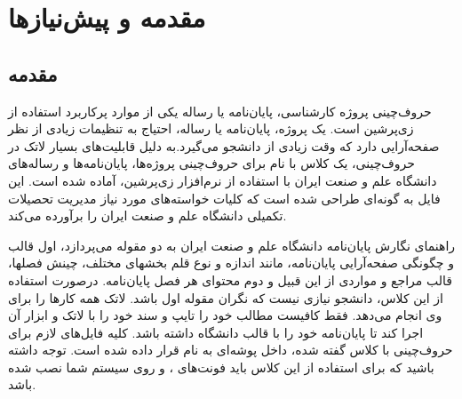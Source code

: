 
\chapter{مقدمه و پیش‌نیاز‌ها}
\thispagestyle{empty}
\section{مقدمه}
حروف‌چینی پروژه کارشناسی، پایان‌نامه یا رساله یکی از موارد پرکاربرد استفاده از زی‌پرشین\cite{Khalighi87xepersian} است.  یک پروژه، پایان‌نامه یا رساله،  احتیاج به تنظیمات زیادی از نظر صفحه‌آرایی  دارد که وقت زیادی از دانشجو می‌گیرد.به دلیل قابلیت‌های بسیار لاتک در حروف‌چینی، یک کلاس با نام 
 برای حروف‌چینی پروژه‌ها، پایان‌نامه‌ها و رساله‌های دانشگاه علم و صنعت ایران با استفاده از نرم‌افزار زی‌پرشین،  آماده شده است. این فایل به 
گونه‌ای طراحی شده است که کلیات خواسته‌های مورد نیاز  مدیریت تحصیلات تکمیلی دانشگاه علم و صنعت ایران \cite{IUSTThesisGuide} را برآورده می‌کند.%

راهنمای نگارش پایان‌نامه دانشگاه علم و صنعت ایران به دو مقوله می‌پردازد، اول قالب و چگونگی صفحه‌آرایی پایان‌نامه، مانند اندازه و نوع قلم بخشهای مختلف، چینش فصلها، قالب مراجع و مواردی از این قبیل و دوم محتوای هر فصل پایان‌نامه. 
درصورت استفاده از این کلاس، دانشجو  نیازی نیست که نگران مقوله اول باشد. لاتک همه کارها را برای وی انجام می‌دهد. فقط کافیست مطالب خود را تایپ و سند خود را با لاتک و ابزار آن اجرا کند تا پایان‌نامه خود را با قالب دانشگاه داشته باشد.
کلیه فایل‌های لازم برای حروف‌چینی با کلاس گفته شده، داخل پوشه‌ای به نام
  قرار داده شده است. توجه داشته باشید که برای استفاده از این کلاس باید فونت‌های
  ،
 و
    روی سیستم شما نصب شده باشد.
